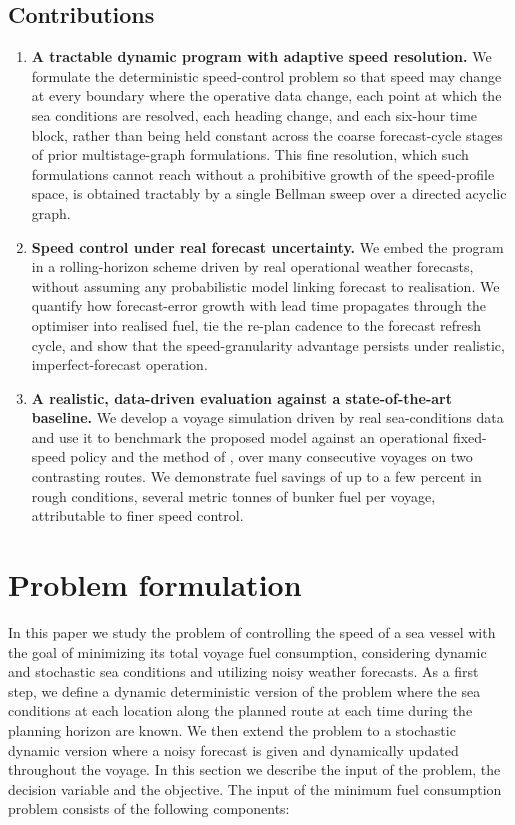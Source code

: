 \documentclass[review,authoryear]{elsarticle}
\begin{document}
\subsection{Contributions}
\begin{enumerate}
\item \textbf{A tractable dynamic program with adaptive speed resolution.} We formulate the
deterministic speed-control problem so that speed may change at every boundary where the operative
data change, each point at which the sea conditions are resolved, each heading change, and each
six-hour time block, rather than being held constant across the coarse forecast-cycle stages of prior
multistage-graph formulations. This fine resolution,
which such formulations cannot reach without a prohibitive growth of the speed-profile space, is
obtained tractably by a single Bellman sweep over a directed acyclic graph.
\item \textbf{Speed control under real forecast uncertainty.} We embed the program in a
rolling-horizon scheme driven by real operational weather forecasts, without assuming any
probabilistic model linking forecast to realisation. We quantify how forecast-error growth with lead
time propagates through the optimiser into realised fuel, tie the re-plan cadence to the forecast
refresh cycle, and show that the speed-granularity advantage persists under realistic,
imperfect-forecast operation.
\item \textbf{A realistic, data-driven evaluation against a state-of-the-art baseline.} We develop a
voyage simulation driven by real sea-conditions data and use it to benchmark the proposed model
against an operational fixed-speed policy and the method of \citet{luo2024}, over many consecutive
voyages on two contrasting routes. We demonstrate fuel savings of up to a few percent in rough
conditions, several metric tonnes of bunker fuel per voyage, attributable to finer speed
control.
\end{enumerate}

\section{Problem formulation}
\label{sec:problem}

In this paper we study the problem of controlling the speed of a sea vessel with the goal of minimizing its total voyage fuel consumption, considering dynamic and stochastic sea conditions and utilizing noisy weather forecasts.  As a first step, we define a dynamic deterministic version of the problem where the sea conditions at each location along the planned route at each time during the planning horizon  are known. We then extend the problem to a stochastic dynamic version where a noisy forecast is given and dynamically updated throughout the voyage.  In this section we describe the input of the problem, the decision variable and the objective.  The input of the minimum fuel consumption problem consists of the following components:
\end{document}
